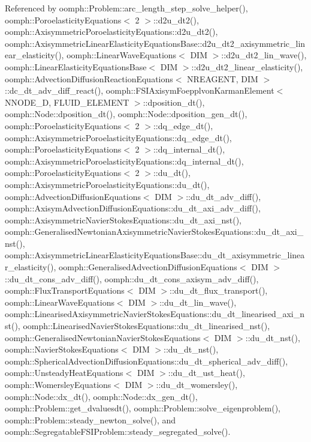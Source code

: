 Referenced by oomph\+::\+Problem\+::arc\+\_\+length\+\_\+step\+\_\+solve\+\_\+helper(), oomph\+::\+Poroelasticity\+Equations$<$ 2 $>$\+::d2u\+\_\+dt2(), oomph\+::\+Axisymmetric\+Poroelasticity\+Equations\+::d2u\+\_\+dt2(), oomph\+::\+Axisymmetric\+Linear\+Elasticity\+Equations\+Base\+::d2u\+\_\+dt2\+\_\+axisymmetric\+\_\+linear\+\_\+elasticity(), oomph\+::\+Linear\+Wave\+Equations$<$ D\+I\+M $>$\+::d2u\+\_\+dt2\+\_\+lin\+\_\+wave(), oomph\+::\+Linear\+Elasticity\+Equations\+Base$<$ D\+I\+M $>$\+::d2u\+\_\+dt2\+\_\+linear\+\_\+elasticity(), oomph\+::\+Advection\+Diffusion\+Reaction\+Equations$<$ N\+R\+E\+A\+G\+E\+N\+T, D\+I\+M $>$\+::dc\+\_\+dt\+\_\+adv\+\_\+diff\+\_\+react(), oomph\+::\+F\+S\+I\+Axisym\+Foepplvon\+Karman\+Element$<$ N\+N\+O\+D\+E\+\_\+D, F\+L\+U\+I\+D\+\_\+\+E\+L\+E\+M\+E\+N\+T $>$\+::dposition\+\_\+dt(), oomph\+::\+Node\+::dposition\+\_\+dt(), oomph\+::\+Node\+::dposition\+\_\+gen\+\_\+dt(), oomph\+::\+Poroelasticity\+Equations$<$ 2 $>$\+::dq\+\_\+edge\+\_\+dt(), oomph\+::\+Axisymmetric\+Poroelasticity\+Equations\+::dq\+\_\+edge\+\_\+dt(), oomph\+::\+Poroelasticity\+Equations$<$ 2 $>$\+::dq\+\_\+internal\+\_\+dt(), oomph\+::\+Axisymmetric\+Poroelasticity\+Equations\+::dq\+\_\+internal\+\_\+dt(), oomph\+::\+Poroelasticity\+Equations$<$ 2 $>$\+::du\+\_\+dt(), oomph\+::\+Axisymmetric\+Poroelasticity\+Equations\+::du\+\_\+dt(), oomph\+::\+Advection\+Diffusion\+Equations$<$ D\+I\+M $>$\+::du\+\_\+dt\+\_\+adv\+\_\+diff(), oomph\+::\+Axisym\+Advection\+Diffusion\+Equations\+::du\+\_\+dt\+\_\+axi\+\_\+adv\+\_\+diff(), oomph\+::\+Axisymmetric\+Navier\+Stokes\+Equations\+::du\+\_\+dt\+\_\+axi\+\_\+nst(), oomph\+::\+Generalised\+Newtonian\+Axisymmetric\+Navier\+Stokes\+Equations\+::du\+\_\+dt\+\_\+axi\+\_\+nst(), oomph\+::\+Axisymmetric\+Linear\+Elasticity\+Equations\+Base\+::du\+\_\+dt\+\_\+axisymmetric\+\_\+linear\+\_\+elasticity(), oomph\+::\+Generalised\+Advection\+Diffusion\+Equations$<$ D\+I\+M $>$\+::du\+\_\+dt\+\_\+cons\+\_\+adv\+\_\+diff(), oomph\+::du\+\_\+dt\+\_\+cons\+\_\+axisym\+\_\+adv\+\_\+diff(), oomph\+::\+Flux\+Transport\+Equations$<$ D\+I\+M $>$\+::du\+\_\+dt\+\_\+flux\+\_\+transport(), oomph\+::\+Linear\+Wave\+Equations$<$ D\+I\+M $>$\+::du\+\_\+dt\+\_\+lin\+\_\+wave(), oomph\+::\+Linearised\+Axisymmetric\+Navier\+Stokes\+Equations\+::du\+\_\+dt\+\_\+linearised\+\_\+axi\+\_\+nst(), oomph\+::\+Linearised\+Navier\+Stokes\+Equations\+::du\+\_\+dt\+\_\+linearised\+\_\+nst(), oomph\+::\+Generalised\+Newtonian\+Navier\+Stokes\+Equations$<$ D\+I\+M $>$\+::du\+\_\+dt\+\_\+nst(), oomph\+::\+Navier\+Stokes\+Equations$<$ D\+I\+M $>$\+::du\+\_\+dt\+\_\+nst(), oomph\+::\+Spherical\+Advection\+Diffusion\+Equations\+::du\+\_\+dt\+\_\+spherical\+\_\+adv\+\_\+diff(), oomph\+::\+Unsteady\+Heat\+Equations$<$ D\+I\+M $>$\+::du\+\_\+dt\+\_\+ust\+\_\+heat(), oomph\+::\+Womersley\+Equations$<$ D\+I\+M $>$\+::du\+\_\+dt\+\_\+womersley(), oomph\+::\+Node\+::dx\+\_\+dt(), oomph\+::\+Node\+::dx\+\_\+gen\+\_\+dt(), oomph\+::\+Problem\+::get\+\_\+dvaluesdt(), oomph\+::\+Problem\+::solve\+\_\+eigenproblem(), oomph\+::\+Problem\+::steady\+\_\+newton\+\_\+solve(), and oomph\+::\+Segregatable\+F\+S\+I\+Problem\+::steady\+\_\+segregated\+\_\+solve().

